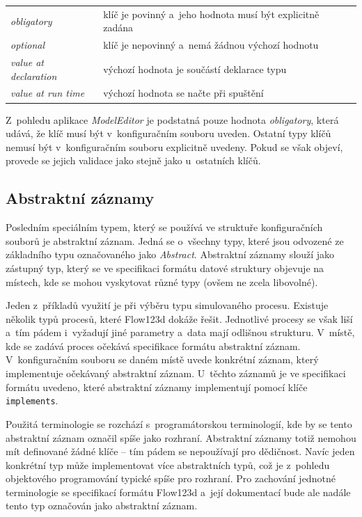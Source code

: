 \documentclass[FM,bw,DP]{tulthesis}
\begin{document}
\begin{longtable}{m{4cm}@{}l}
\textit{obligatory}\dotfill & klíč je povinný a~jeho hodnota musí být explicitně zadána \\
\textit{optional}\dotfill & klíč je nepovinný a~nemá žádnou výchozí hodnotu \\
\textit{value at declaration}\dotfill & výchozí hodnota je součástí deklarace typu \\
\textit{value at run time}\dotfill & výchozí hodnota se načte při spuštění \\
\end{longtable}

Z~pohledu aplikace \textit{ModelEditor} je podstatná pouze hodnota \textit{obligatory}, která udává, že klíč musí být v~konfiguračním souboru uveden. Ostatní typy klíčů nemusí být v~konfiguračním souboru explicitně uvedeny. Pokud se však objeví, provede se jejich validace jako stejně jako u~ostatních klíčů.

\subsection{Abstraktní záznamy}
\label{sec:analyza-specifikace-formatu-abstraktni-zaznamy}

Posledním speciálním typem, který se používá ve struktuře konfiguračních souborů je abstraktní záznam. Jedná se o~všechny typy, které jsou odvozené ze základního typu označovaného jako \textit{Abstract}. Abstraktní záznamy slouží jako zástupný typ, který se ve specifikaci formátu datové struktury objevuje na místech, kde se mohou vyskytovat různé typy (ovšem ne zcela libovolné).

Jeden z~příkladů využití je při výběru typu simulovaného procesu. Existuje několik typů procesů, které Flow123d dokáže řešit. Jednotlivé procesy se však liší a~tím pádem i~vyžadují jiné parametry a~data mají odlišnou strukturu.
V~místě, kde se zadává proces očekává specifikace formátu abstraktní záznam.
V~konfiguračním souboru se daném místě uvede konkrétní záznam, který implementuje očekávaný abstraktní záznam. U~těchto záznamů je ve specifikaci formátu uvedeno, které abstraktní záznamy implementují pomocí klíče \texttt{implements}.

Použitá terminologie se rozchází s~programátorskou terminologií, kde by se tento abstraktní záznam označil spíše jako rozhraní. Abstraktní záznamy totiž nemohou mít definované žádné klíče -- tím pádem se nepoužívají pro dědičnost. Navíc jeden konkrétní typ může implementovat více abstraktních typů, což je z~pohledu objektového programování typické spíše pro rozhraní. Pro zachování jednotné terminologie se specifikací formátu Flow123d a~její dokumentací bude ale nadále tento typ označován jako abstraktní záznam.
\end{document}
